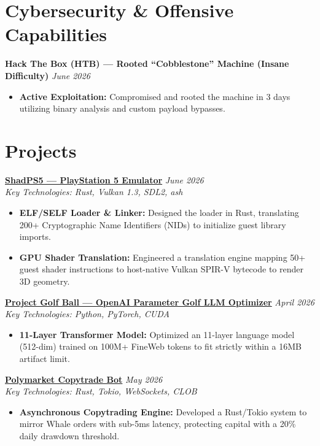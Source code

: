 \documentclass[10pt,letterpaper]{article}
\newcommand{\project}[4]{
    \noindent\textbf{\href{#4}{\color{primary}#1}} \hfill \textit{#2} \\
    \noindent\textit{Key Technologies: #3}
}
\newcommand{\achievement}[2]{
    \noindent\textbf{\color{primary}#1} \hfill \textit{#2}
}
\begin{document}
\section*{Cybersecurity \& Offensive Capabilities}
\achievement{Hack The Box (HTB) — Rooted ``Cobblestone'' Machine (Insane Difficulty)}{June 2026}
\begin{itemize}
    \item \textbf{Active Exploitation:} Compromised and rooted the machine in 3 days utilizing binary analysis and custom payload bypasses.
\end{itemize}

\section*{Projects}

\project{ShadPS5 — PlayStation 5 Emulator}{June 2026}{Rust, Vulkan 1.3, SDL2, ash}{https://github.com/yahya-azeem/ShadPS5}
\begin{itemize}
    \item \textbf{ELF/SELF Loader \& Linker:} Designed the loader in Rust, translating 200+ Cryptographic Name Identifiers (NIDs) to initialize guest library imports.
    \item \textbf{GPU Shader Translation:} Engineered a translation engine mapping 50+ guest shader instructions to host-native Vulkan SPIR-V bytecode to render 3D geometry.
\end{itemize}

\vspace{6pt}

\project{Project Golf Ball — OpenAI Parameter Golf LLM Optimizer}{April 2026}{Python, PyTorch, CUDA}{https://github.com/yahya-azeem/Project-Golf-Ball}
\begin{itemize}
    \item \textbf{11-Layer Transformer Model:} Optimized an 11-layer language model (512-dim) trained on 100M+ FineWeb tokens to fit strictly within a 16MB artifact limit.
\end{itemize}

\vspace{6pt}

\project{Polymarket Copytrade Bot}{May 2026}{Rust, Tokio, WebSockets, CLOB}{https://github.com/yahya-azeem/polymarket-copy-bot-rust}
\begin{itemize}
    \item \textbf{Asynchronous Copytrading Engine:} Developed a Rust/Tokio system to mirror Whale orders with sub-5ms latency, protecting capital with a 20\% daily drawdown threshold.
\end{itemize}
\end{document}
